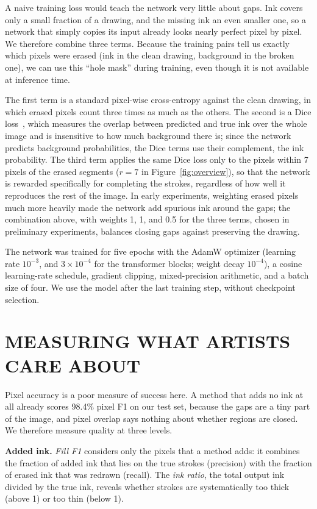 \documentclass{IEEEcsmag}
\begin{document}
A naive training loss would teach the network very little about gaps. Ink covers only
a small fraction of a drawing, and the missing ink an even smaller one, so a network
that simply copies its input already looks nearly perfect pixel by pixel. We
therefore combine three terms. Because the training pairs tell us exactly which
pixels were erased (ink in the clean drawing, background in the broken one), we can
use this ``hole mask'' during training, even though it is
not available at inference time.

The first term is a standard pixel-wise cross-entropy against the clean drawing, in
which erased pixels count three times as much as the others. The second is a Dice
loss~\cite{milletari2016vnet}, which measures the overlap between predicted and true
ink over the whole image and is insensitive to how much background there is; since
the network predicts background probabilities, the Dice terms use their complement,
the ink probability. The third term applies the same Dice loss only to the pixels
within 7 pixels of the erased segments ($r=7$ in Figure~\ref{fig:overview}), so that the network is rewarded specifically for completing the
strokes, regardless of how well it reproduces the rest of the image. In early
experiments, weighting erased pixels much more heavily made the network add spurious
ink around the gaps; the combination above, with weights 1, 1, and 0.5 for the three
terms, chosen in preliminary experiments, balances closing gaps against preserving
the drawing.

The network was trained for five epochs with the AdamW optimizer (learning rate
$10^{-3}$, and $3\times 10^{-4}$ for the transformer blocks; weight decay $10^{-4}$),
a cosine learning-rate schedule, gradient clipping, mixed-precision arithmetic, and
a batch size of four. We use the model after the last training step, without
checkpoint selection.

\section{MEASURING WHAT ARTISTS CARE ABOUT}

Pixel accuracy is a poor measure of success here. A method that adds no ink at all
already scores 98.4\% pixel F1 on our test set, because the gaps are a tiny part of
the image, and pixel overlap says nothing about whether regions are closed. We
therefore measure quality at three levels.

\textbf{Added ink.} \emph{Fill F1} considers only the pixels that a method adds: it
combines the fraction of added ink that lies on the true strokes (precision) with the
fraction of erased ink that was redrawn (recall). The \emph{ink ratio}, the total
output ink divided by the true ink, reveals whether strokes are systematically too
thick (above 1) or too thin (below 1).
\end{document}
